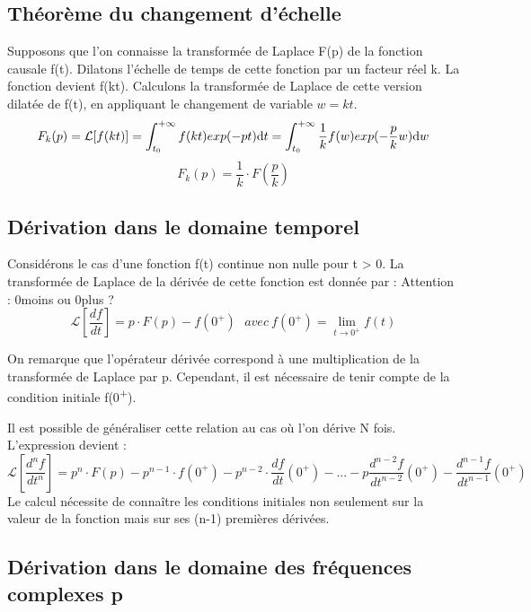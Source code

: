 \documentclass[]{book}
\begin{document}
{	\subsection{Théorème du changement d'échelle}
	
	Supposons que l'on connaisse la transformée de Laplace F(p) de la
	fonction causale f(t). Dilatons l'échelle de temps de cette fonction par
	un facteur réel k. La fonction devient f(kt). Calculons la transformée
	de Laplace de cette version dilatée de f(t), en appliquant le changement
	de variable $w = kt$.
	\begin{equation*}
	F_{k}(p) = \mathcal{L}[f(kt)]=\int_{t_{0}}^{+\infty}f(kt)exp(-pt) \mathrm{d} t  =\int_{t_{0}}^{+\infty}\frac{1}{k}f(w)exp(-\frac{p}{k}w) \mathrm{d} w 
	\end{equation*}
	\begin{equation}\label{}
	F_{k}(p) = \frac{1}{k}\cdot F(\frac{p}{k})
	\end{equation}
	
	\subsection{Dérivation dans le domaine temporel}
	Considérons le cas d'une fonction f(t) continue non nulle pour t > 0. La transformée de Laplace de la dérivée de cette fonction est donnée par :
	Attention : 0moins ou 0plus ?
	\begin{equation}\label{key}
	\mathcal{L}[\frac{df}{dt}] = p\cdot F(p)-f(0^{+}) ~~~avec~f(0^{+})=\lim_{t\rightarrow0^{+}}f(t)
	\end{equation}

	On remarque que l'opérateur dérivée correspond à une multiplication de
	la transformée de Laplace par p. Cependant, il est nécessaire de tenir
	compte de la condition initiale f(0\textsuperscript{+}).
	
	Il est possible de généraliser cette relation au cas où l'on dérive N
	fois. L'expression devient :
	\begin{equation}\label{key}
	\mathcal{L}[\frac{d^{n}f}{dt^{n}}] = p^{n}\cdot F(p)-p^{n-1}\cdot f(0^{+})-p^{n-2}\cdot \frac{df}{dt}(0^{+})-...-p\frac{d^{n-2}f}{dt^{n-2}}(0^{+})-\frac{d^{n-1}f}{dt^{n-1}}(0^{+})
	\end{equation}
	Le calcul nécessite de connaître les conditions initiales non seulement sur la valeur de la fonction mais sur ses (n-1) premières dérivées.
	
	\subsection{Dérivation dans le domaine des fréquences complexes p}
	
}
\end{document}
